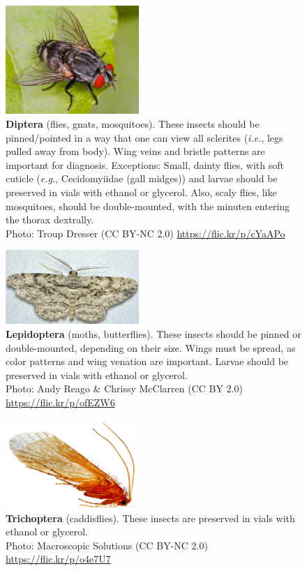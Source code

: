 \documentclass[letterpaper, 11pt]{article}
\begin{document}
\begin{figure}
  \caption{\textbf{Diptera} (flies, gnats, mosquitoes). These insects should be pinned/pointed in a way that one can view all sclerites (\textit{i.e.}, legs pulled away from body). Wing veins and bristle patterns are important for diagnosis. Exceptions: Small, dainty flies, with soft cuticle (\textit{e.g.}, Cecidomyiidae (gall midges)) and larvae should be preserved in vials with ethanol or glycerol. Also, scaly flies, like mosquitoes, should be double-mounted, with the minuten entering the thorax dextrally.\\ Photo: Troup Dresser (CC BY-NC 2.0) \url{https://flic.kr/p/cYaAPo}}
  \includegraphics[width=0.45\textwidth]{Diptera}
\end{figure}

\clearpage

\begin{figure}
  \caption{\textbf{Lepidoptera} (moths, butterflies). These insects should be pinned or double-mounted, depending on their size. Wings must be spread, as color patterns and wing venation are important. Larvae should be preserved in vials with ethanol or glycerol.\\ Photo: Andy Reago \& Chrissy McClarren (CC BY 2.0) \url{https://flic.kr/p/ofEZW6}}
  \includegraphics[width=0.45\textwidth]{Lepidoptera}
\end{figure}

\begin{figure}
  \caption{\textbf{Trichoptera} (caddisflies). These insects are preserved in vials with ethanol or glycerol.\\ Photo: Macroscopic Solutions (CC BY-NC 2.0) \url{https://flic.kr/p/o4e7U7}}
  \includegraphics[width=0.45\textwidth]{Trichoptera}
\end{figure}
\end{document}

